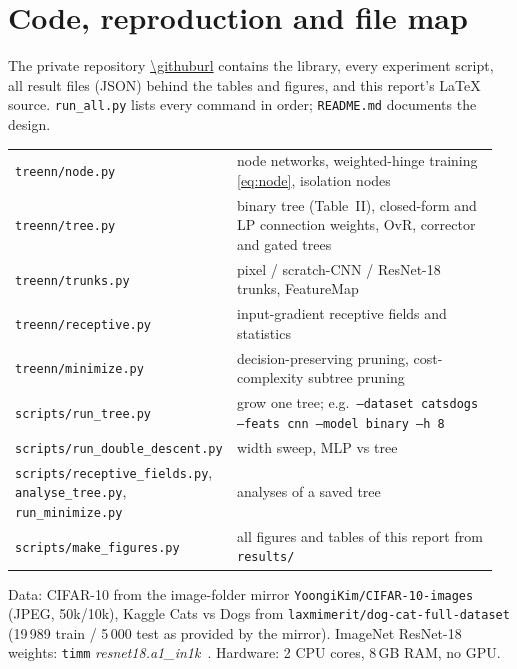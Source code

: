 \section{Code, reproduction and file map}
\label{app:code}
The private repository \url{\githuburl} contains the library, every experiment script, all result
files (JSON) behind the tables and figures, and this report's \LaTeX{} source. \texttt{run\_all.py}
lists every command in order; \texttt{README.md} documents the design.

\begin{center}\small
\begin{tabular}{@{}>{\raggedright\arraybackslash}p{0.42\linewidth}>{\raggedright\arraybackslash}p{0.54\linewidth}@{}}
\toprule
\texttt{treenn/node.py} & node networks, weighted-hinge training \eqref{eq:node}, isolation nodes\\
\texttt{treenn/tree.py} & binary tree (Table~II), closed-form and LP connection weights, OvR, corrector and gated trees\\
\texttt{treenn/trunks.py} & pixel / scratch-CNN / ResNet-18 trunks, FeatureMap\\
\texttt{treenn/receptive.py} & input-gradient receptive fields and statistics\\
\texttt{treenn/minimize.py} & decision-preserving pruning, cost-complexity subtree pruning\\
\texttt{scripts/run\_tree.py} & grow one tree; e.g.\ \texttt{--dataset catsdogs --feats cnn --model binary --h 8}\\
\texttt{scripts/run\_double\_descent.py} & width sweep, MLP vs tree\\
\texttt{scripts/receptive\_fields.py}, \texttt{analyse\_tree.py}, \texttt{run\_minimize.py} & analyses of a saved tree\\
\texttt{scripts/make\_figures.py} & all figures and tables of this report from \texttt{results/}\\
\bottomrule
\end{tabular}
\end{center}

\noindent Data: CIFAR-10 from the image-folder mirror \texttt{YoongiKim/CIFAR-10-images} (JPEG, 50k/10k),
Kaggle Cats vs Dogs from \texttt{laxmimerit/dog-cat-full-dataset} (19\,989 train / 5\,000 test as
provided by the mirror). ImageNet ResNet-18 weights: \texttt{timm} \emph{resnet18.a1\_in1k}~\cite{timm}.
Hardware: 2 CPU cores, 8\,GB RAM, no GPU.
